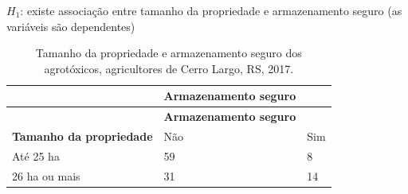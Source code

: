 \documentclass[12pt,brazil,oneside]{book}
\begin{document}
\(H_1\): existe associação entre tamanho da propriedade e armazenamento seguro (as variáveis são dependentes)

\begin{longtable}[]{@{}lll@{}}
\caption{\label{tab:tamprop}Tamanho da propriedade e armazenamento seguro dos agrotóxicos, agricultores de Cerro Largo, RS, 2017.}\tabularnewline
\toprule
\begin{minipage}[b]{0.35\columnwidth}\raggedright
\strut
\end{minipage} & \begin{minipage}[b]{0.32\columnwidth}\raggedright
\textbf{Armazenamento seguro}\strut
\end{minipage} & \begin{minipage}[b]{0.16\columnwidth}\raggedright
\strut
\end{minipage}\tabularnewline
\midrule
\endfirsthead
\toprule
\begin{minipage}[b]{0.35\columnwidth}\raggedright
\strut
\end{minipage} & \begin{minipage}[b]{0.32\columnwidth}\raggedright
\textbf{Armazenamento seguro}\strut
\end{minipage} & \begin{minipage}[b]{0.16\columnwidth}\raggedright
\strut
\end{minipage}\tabularnewline
\midrule
\endhead
\begin{minipage}[t]{0.35\columnwidth}\raggedright
\textbf{Tamanho da propriedade}\strut
\end{minipage} & \begin{minipage}[t]{0.32\columnwidth}\raggedright
Não\strut
\end{minipage} & \begin{minipage}[t]{0.16\columnwidth}\raggedright
Sim\strut
\end{minipage}\tabularnewline
\begin{minipage}[t]{0.35\columnwidth}\raggedright
Até 25 ha\strut
\end{minipage} & \begin{minipage}[t]{0.32\columnwidth}\raggedright
59\strut
\end{minipage} & \begin{minipage}[t]{0.16\columnwidth}\raggedright
8\strut
\end{minipage}\tabularnewline
\begin{minipage}[t]{0.35\columnwidth}\raggedright
26 ha ou mais\strut
\end{minipage} & \begin{minipage}[t]{0.32\columnwidth}\raggedright
31\strut
\end{minipage} & \begin{minipage}[t]{0.16\columnwidth}\raggedright
14\strut
\end{minipage}\tabularnewline
\bottomrule
\end{longtable}
\end{document}
